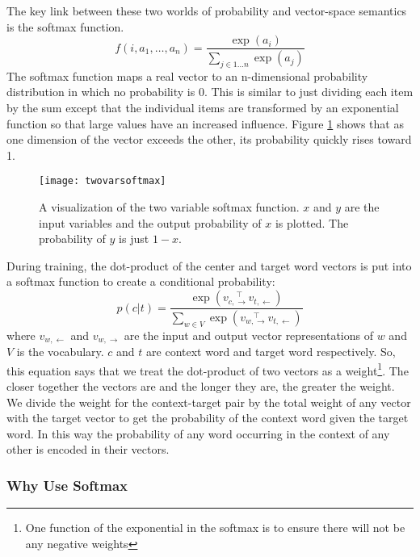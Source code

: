 The key link between these two worlds of probability and vector-space semantics
is the softmax function.
%
\[f(i, a_1,\dots, a_n)=\frac{\exp\left(a_i\right)}
{\sum_{j \in 1\dots{}n}\exp\left(a_j\right)}\]
%
The softmax function maps a real vector to an n-dimensional
probability distribution in which no probability is 0. This is similar to just
dividing each item by the sum except that the individual items are transformed
by an exponential function so that large values have an increased influence.
Figure \ref{fig:twovarsoftmax} shows that as one dimension of the vector 
exceeds the other, its probability quickly rises toward 1.

\begin{figure}[tbp]
  \texttt{[image: twovarsoftmax]}
  \caption{A visualization of the two variable softmax function. $x$ and $y$
  are the input variables and the output probability of $x$ is plotted. The
  probability of $y$ is just $1-x$.}
  \label{fig:twovarsoftmax}
\end{figure}


During training, the dot-product of the center and target word vectors 
is put into a softmax function to create a conditional probability: 
%
\begin{equation}
  \label{eq:softmaxwithdotprod}
  p(c|t)=\frac{\exp\left(v_{c,\to} ^{\quad\top} v_{t,\gets}\right)}
  {\sum_{w \in V}\exp\left(v_{w,\to} ^{\quad\top} v_{t,\gets}\right)}
\end{equation}
%
where $v_{w,\gets}$ and $v_{w,\to}$ are the input and output vector 
representations of $w$ and $V$ is the vocabulary. $c$ and $t$ are context word 
and target word respectively. So, this equation says that we 
treat the dot-product of two vectors as a weight\footnote{One function of the 
exponential in the softmax is to ensure there will not be any negative 
weights}. The closer together the vectors 
are and the longer they are, the greater the weight. We divide the weight for 
the context-target pair by the total weight of any vector with the target vector
to get the probability of the context word given the target word. In this way
the probability of any word occurring in the context of any other is encoded
in their vectors.

\subsubsection{Why Use Softmax}

